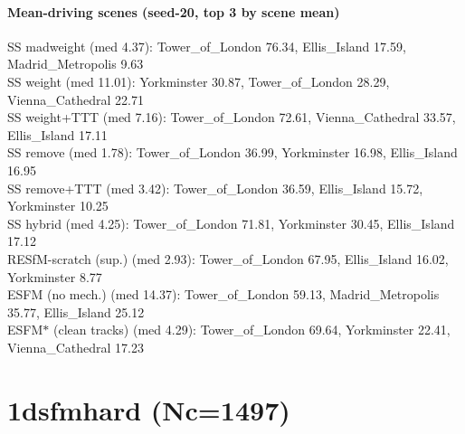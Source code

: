 \documentclass[10pt]{article}
\begin{document}
\paragraph{Mean-driving scenes (seed-20, top 3 by scene mean)}
\indent SS madweight (med 4.37): Tower\_of\_London 76.34, Ellis\_Island 17.59, Madrid\_Metropolis 9.63\\
\indent SS weight (med 11.01): Yorkminster 30.87, Tower\_of\_London 28.29, Vienna\_Cathedral 22.71\\
\indent SS weight+TTT (med 7.16): Tower\_of\_London 72.61, Vienna\_Cathedral 33.57, Ellis\_Island 17.11\\
\indent SS remove (med 1.78): Tower\_of\_London 36.99, Yorkminster 16.98, Ellis\_Island 16.95\\
\indent SS remove+TTT (med 3.42): Tower\_of\_London 36.59, Ellis\_Island 15.72, Yorkminster 10.25\\
\indent SS hybrid (med 4.25): Tower\_of\_London 71.81, Yorkminster 30.45, Ellis\_Island 17.12\\
\indent RESfM-scratch (sup.) (med 2.93): Tower\_of\_London 67.95, Ellis\_Island 16.02, Yorkminster 8.77\\
\indent ESFM (no mech.) (med 14.37): Tower\_of\_London 59.13, Madrid\_Metropolis 35.77, Ellis\_Island 25.12\\
\indent ESFM$\ast$ (clean tracks) (med 4.29): Tower\_of\_London 69.64, Yorkminster 22.41, Vienna\_Cathedral 17.23\\
\section*{1dsfmhard  (Nc=1497)}
\begin{center}\end{center}
\end{document}
